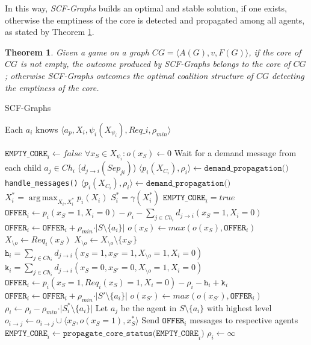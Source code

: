 \documentclass[11pt, twoside, titlepage, a4paper, openright]{report}
\newtheorem{Th}{Theorem}
\begin{document}
\noindent In this way, \textit{SCF-Graphs} builds an optimal and stable solution, if one exists, otherwise the emptiness of the core is detected and propagated among all agents, as stated by Theorem \ref{th:scfcorrect}.
 
\begin{Th}\label{th:scfcorrect}
Given a game on a graph $CG=\langle A(G), v, F(G)\rangle$, if the core of $CG$ is not empty, the outcome produced by SCF-Graphs belongs to the core of $CG$; otherwise SCF-Graphs outcomes the optimal coalition structure of $CG$ detecting the emptiness of the core.
\end{Th}

\begin{algorithm}
\caption{SCF-Graphs}
\label{algo:scfgraphs}
\small Each $a_i$ knows $\langle a_p,  X_i,\psi_i(X_{\psi_i}),Req\_i,\rho_{min}\rangle$ 
\begin{algorithmic}[1]
\State $\texttt{EMPTY\_CORE}_i\gets false$
\State $\forall{x_S \in X_{\psi_i}}: o(x_S)\gets 0$ 
\State Wait for a demand message from each child $a_j\in Ch_i$ ($d_{j \rightarrow i}(Sep_{ji})$)
\State $\langle p_i(X_{C_i}), \rho_i \rangle \gets \texttt{demand\_propagation()}$
\State \texttt{handle\_messages()} 
\State $\langle p_i(X_{C_i}), \rho_i \rangle \gets \texttt{demand\_propagation()}$
\EndWhile
\State $X^*_{i} = \operatorname*{arg\,max}_{X_{i}, X^{*}_i} p_i(X_{i})$
\State $S^*_i=\gamma(X^*_{i})$
\State $\texttt{EMPTY\_CORE}_i=true$
\EndIf  
{}
\State $\texttt{OFFER}_i \gets p_i(x_S=1,X_{i}=0) -\rho_i-\sum_{j\in Ch_i} d_{j\rightarrow i}(x_S=1, X_{i}=0)$
\State $\texttt{OFFER}_i \gets \texttt{OFFER}_i + \rho_{min}\cdot \vert S\setminus \{a_i\}\vert $
\EndIf 
\State $o(x_{S})\gets max(o(x_{S}),\texttt{OFFER}_i)$
\Else
\State $X_{\setminus o} \gets Req_i(x_S)$
\State $X_{\setminus o} \gets X_{\setminus o} \setminus \{x_{S'}\} $
\State $\texttt{h}_i=\sum_{j\in Ch_i} d_{j\rightarrow i}(x_S=1, x_{S'}=1, X_{\setminus o} = 1,X_{i}=0)$
\State $\texttt{k}_i=\sum_{j\in Ch_i}d_{j\rightarrow i}(x_S=0, x_{S'}=0, X_{\setminus o} = 1,X_{i}=0)$
\State $\texttt{OFFER}_i \gets p_i(x_S=1,Req_i(x_S)=1,X_{i}=0)-\rho_i-\texttt{h}_i +\texttt{k}_i$
\State $\texttt{OFFER}_i \gets \texttt{OFFER}_i + \rho_{min}\cdot \vert S'\setminus \{a_i\}\vert $
\EndIf 
\State $o(x_{S'})\gets max(o(x_{S'}),\texttt{OFFER}_i)$
\EndFor
\EndIf
\EndFor
\State $\rho_i \gets  \rho_i - \rho_{min}\cdot \vert S^*_i\setminus \{a_i\}\vert$
\State Let $a_j$ be the agent in $S\setminus \{a_i\}$ with highest level
\State $o_{i\rightarrow j}\gets o_{i\rightarrow j} \cup \langle x_{S}, o(x_{S}=1),x^*_{S}\rangle$
\EndFor
\State Send $\texttt{OFFER}_i$ messages to respective agents
\State $\texttt{EMPTY\_CORE}_i\gets \texttt{propagate\_core\_status(EMPTY\_CORE}_i\texttt{)}$
\State $\rho_i \gets \infty$
\EndIf
\end{algorithmic}
\label{proc:scf_graphs}
\end{algorithm}
 
\end{document}
